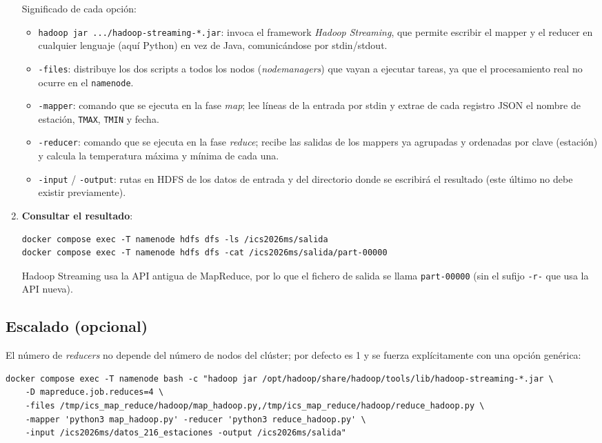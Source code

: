 \documentclass[11pt,a4paper]{article}
\begin{document}
\begin{enumerate}
Significado de cada opción:
\begin{itemize}
    \item \texttt{hadoop jar .../hadoop-streaming-*.jar}: invoca el framework \emph{Hadoop Streaming}, que permite escribir el mapper y el reducer en cualquier lenguaje (aquí Python) en vez de Java, comunicándose por stdin/stdout.
    \item \texttt{-files}: distribuye los dos scripts a todos los nodos (\emph{nodemanagers}) que vayan a ejecutar tareas, ya que el procesamiento real no ocurre en el \texttt{namenode}.
    \item \texttt{-mapper}: comando que se ejecuta en la fase \emph{map}; lee líneas de la entrada por stdin y extrae de cada registro JSON el nombre de estación, \texttt{TMAX}, \texttt{TMIN} y fecha.
    \item \texttt{-reducer}: comando que se ejecuta en la fase \emph{reduce}; recibe las salidas de los mappers ya agrupadas y ordenadas por clave (estación) y calcula la temperatura máxima y mínima de cada una.
    \item \texttt{-input} / \texttt{-output}: rutas en HDFS de los datos de entrada y del directorio donde se escribirá el resultado (este último no debe existir previamente).
\end{itemize}

\item \textbf{Consultar el resultado}:
\begin{lstlisting}
docker compose exec -T namenode hdfs dfs -ls /ics2026ms/salida
docker compose exec -T namenode hdfs dfs -cat /ics2026ms/salida/part-00000
\end{lstlisting}
Hadoop Streaming usa la API antigua de MapReduce, por lo que el fichero de salida se llama \texttt{part-00000} (sin el sufijo \texttt{-r-} que usa la API nueva).

\end{enumerate}

\subsection{Escalado (opcional)}

El número de \emph{reducers} no depende del número de nodos del clúster; por defecto es 1 y se fuerza explícitamente con una opción genérica:

\begin{lstlisting}
docker compose exec -T namenode bash -c "hadoop jar /opt/hadoop/share/hadoop/tools/lib/hadoop-streaming-*.jar \
    -D mapreduce.job.reduces=4 \
    -files /tmp/ics_map_reduce/hadoop/map_hadoop.py,/tmp/ics_map_reduce/hadoop/reduce_hadoop.py \
    -mapper 'python3 map_hadoop.py' -reducer 'python3 reduce_hadoop.py' \
    -input /ics2026ms/datos_216_estaciones -output /ics2026ms/salida"
\end{lstlisting}
\end{document}
